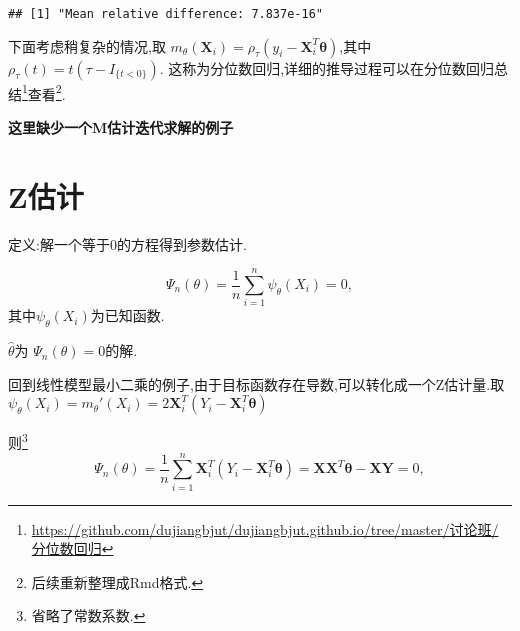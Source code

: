 \documentclass[]{ctexbook}
\newenvironment{Shaded}{\begin{snugshade}}{\end{snugshade}}
\newcommand{\DataTypeTok}[1]{\textcolor[rgb]{0.13,0.29,0.53}{#1}}
\newcommand{\DecValTok}[1]{\textcolor[rgb]{0.00,0.00,0.81}{#1}}
\newcommand{\FloatTok}[1]{\textcolor[rgb]{0.00,0.00,0.81}{#1}}
\newcommand{\KeywordTok}[1]{\textcolor[rgb]{0.13,0.29,0.53}{\textbf{#1}}}
\newcommand{\NormalTok}[1]{#1}
\newcommand{\OperatorTok}[1]{\textcolor[rgb]{0.81,0.36,0.00}{\textbf{#1}}}
\renewcommand{\href}[2]{#2\footnote{\url{#1}}}
\begin{document}
\begin{Shaded}
\end{Shaded}

\begin{verbatim}
## [1] "Mean relative difference: 7.837e-16"
\end{verbatim}

下面考虑稍复杂的情况,取
\(m_{\theta}\left(\boldsymbol{X}_{i}\right)=\rho_{\tau}\left(y_{i}-\boldsymbol{X}_{i}^{T} \boldsymbol{\theta}\right)\),其中
\(\rho_{\tau}(t)=t\left(\tau-I_{\{t<0\}}\right)\).
这称为分位数回归,详细的推导过程可以在\href{https://github.com/dujiangbjut/dujiangbjut.github.io/tree/master/讨论班/分位数回归}{分位数回归总结}查看\footnote{后续重新整理成Rmd格式.}.

\textbf{这里缺少一个M估计迭代求解的例子}

\hypertarget{z}{%
\section{Z估计}\label{z}}

定义:解一个等于0的方程得到参数估计.

\[
\Psi_{n}(\theta)=\frac{1}{n} \sum_{i=1}^{n} \psi_{\theta}\left(X_{i}\right)=0,
\]
其中\(\psi_{\theta}\left(X_{i}\right)\)为已知函数.

\(\hat{\theta}\)为
\(\Psi_{n}(\theta)=0\)的解.

回到线性模型最小二乘的例子,由于目标函数存在导数,可以转化成一个Z估计量.取
\(\psi_{\theta}\left(X_{i}\right)=m_{\theta}'\left(X_{i}\right)=2\boldsymbol{X}_{i}^{T} \left(Y_{i}-\boldsymbol{X}_{i}^{T} \boldsymbol{\theta}\right)\)

则\footnote{省略了常数系数.}
\[
\Psi_{n}(\theta)=\frac{1}{n} \sum_{i=1}^{n}\boldsymbol{X}_{i}^{T}  \left(Y_{i}-\boldsymbol{X}_{i}^{T} \boldsymbol{\theta}\right) =\boldsymbol{X} \boldsymbol{X}^{T} \boldsymbol{\theta}-\boldsymbol{X} \boldsymbol{Y}=0,
\]
\end{document}
